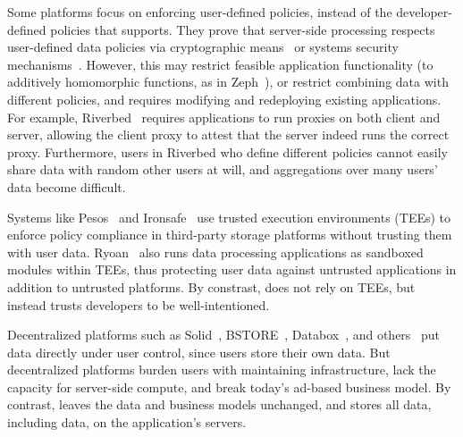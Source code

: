 Some platforms focus on enforcing user-defined policies, instead of the
developer-defined policies that \sys supports. They prove that server-side
processing respects user-defined data policies via cryptographic
means~\cite{zeph} or systems security mechanisms~\cite{riverbed}.
%
However, this may restrict feasible application functionality (\eg to additively
homomorphic functions, as in Zeph~\cite{zeph}), or restrict combining data with
different policies, and requires modifying and redeploying existing
applications.
%
For example, Riverbed~\cite{riverbed} requires applications to run proxies on
both client and server, allowing the client proxy to attest that the server
indeed runs the correct proxy. 
%
Furthermore, users in Riverbed who define different policies cannot easily share
data with random other users at will, and aggregations over many users' data
become difficult.

%
Systems like Pesos~\cite{pesos} and Ironsafe~\cite{ironsafe} use trusted
execution environments (TEEs) to enforce policy compliance in third-party
storage platforms without trusting them with user data. 
%
Ryoan~\cite{ryoan} also runs data processing applications as sandboxed modules
within TEEs, thus protecting user data against untrusted applications in
addition to untrusted platforms.
%
By constrast, \sys does not rely on TEEs, but instead trusts developers to be
well-intentioned.
%

Decentralized platforms such as Solid~\cite{solid}, BSTORE~\cite{bstore},
Databox~\cite{databox}, and others~\cite{diy, amber, oort, w5, blockstack} put
data directly under user control, since users store their own data.
%
But decentralized platforms burden users with maintaining infrastructure, lack
the capacity for server-side compute, and break today's ad-based
business model.
%
By contrast, \sys leaves the data and business models unchanged,
and stores all data, including \xxed data, on the application's servers.
%

